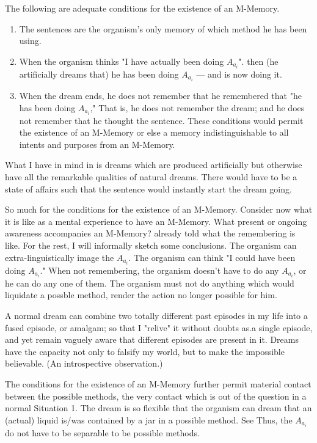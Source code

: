 \documentclass[10pt,twoside,draft]{memoir}
\begin{document}
{{ The following are adequate conditions for the existence 
of an M-Memory. 
\begin{enumerate}
\item The sentences are the organism's only memory of which 
method he has been using. 

\item When the organism thinks "I have actually been doing $A_{a_i}$".
then (he artificially dreams that) he has been doing $A_{a_i}$ --- and is 
now doing it. 

\item When the dream ends, he does not remember that he 
remembered that "he has been doing $A_{a_i}$," That is, he does not remember 
the dream; and he does not remember that he thought the sentence. These 
conditions would permit the existence of an M-Memory or else a memory 
indistinguishable to all intents and purposes from an M-Memory. 
\end{enumerate}

What I have in mind in  is dreams which are produced 
artificially but otherwise have all the remarkable qualities of natural dreams. 
There would have to be a state of affairs such that the sentence would 
instantly start the dream going. 

So much for the conditions for the existence of an M-Memory. 
Consider now what it is like as a mental experience to have an M-Memory. 
What present or ongoing awareness accompanies an M-Memory? 
 already told what the remembering is like. For the rest, I will 
informally sketch some conclusions. The organism can extra-linguistically 
image the $A_{a_i}$. The organism can think "I could have been doing $A_{a_i}$." When 
not remembering, the organism doesn't have to do any $A_{a_i}$, or he can do any 
one of them. The organism must not do anything which would liquidate a 
possble method, render the action no longer possible for him. 

 A normal dream can combine two totally different 
past episodes in my life into a fused episode, or amalgam; so that I "relive" it 
without doubts as.a single episode, and yet remain vaguely aware that 
different episodes are present in it. Dreams have the capacity not only to 
falsify my world, but to make the impossible believable. (An introspective 
observation.) 

 The conditions for the existence of an M-Memory 
further permit material contact between the possible methods, the very 
contact which is out of the question in a normal Situation 1. The dream is so 
flexible that the organism can dream that an (actual) liquid is\slash was contained 
by a jar in a possible method. See  Thus, the $A_{a_i}$ do not have 
to be separable to be possible methods. 

}}
\end{document}
